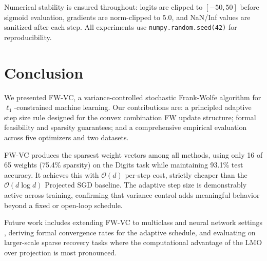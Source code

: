 \documentclass[10pt,twocolumn]{article}
\begin{document}
Numerical stability is ensured throughout: logits are clipped to
$[-50, 50]$ before sigmoid evaluation, gradients are norm-clipped to
$5.0$, and NaN/Inf values are sanitized after each step. All experiments
use \texttt{numpy.random.seed(42)} for reproducibility.


\section{Conclusion}
\label{sec:conclusion}

We presented FW-VC, a variance-controlled stochastic Frank-Wolfe
algorithm for $\ell_1$-constrained machine learning. Our contributions are:
a principled adaptive step size rule designed for the convex combination
FW update structure; formal feasibility and sparsity guarantees; and a
comprehensive empirical evaluation across five optimizers and two datasets.

FW-VC produces the sparsest weight vectors among all methods, using only
16 of 65 weights (75.4\% sparsity) on the Digits task while maintaining
93.1\% test accuracy. It achieves this with $\mathcal{O}(d)$ per-step
cost, strictly cheaper than the $\mathcal{O}(d\log d)$ Projected SGD
baseline. The adaptive step size is demonstrably active across training,
confirming that variance control adds meaningful behavior beyond a fixed
or open-loop schedule.

Future work includes extending FW-VC to multiclass and neural network
settings \cite{pokutta2020}, deriving formal convergence rates for the
adaptive schedule, and evaluating on larger-scale sparse recovery tasks
where the computational advantage of the LMO over projection is most
pronounced.
\end{document}
